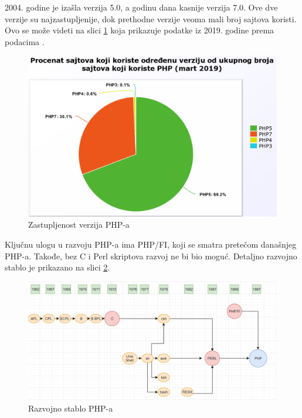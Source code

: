 \documentclass[a4paper]{article}
\begin{document}
{2004. godine je izašla verzija 5.0, a godinu dana kasnije verzija 7.0. Ove dve verzije su najzastupljenije, dok prethodne verzije veoma mali broj sajtova koristi. Ovo se može videti na slici \ref{fig:proc_zastupljenosti} koja prikazuje podatke iz 2019. godine prema podacima \cite{stats}.

\begin{figure}[h!]
\begin{center}
\includegraphics[scale=0.25]{zastupljenost2019.png}
\end{center}
\label{fig:proc_zastupljenosti}
\caption{Zastupljenost verzija PHP-a}
\end{figure}

Ključnu ulogu u razvoju PHP-a ima PHP/FI, koji se smatra pretečom današnjeg PHP-a. Takođe, bez C i Perl skriptova razvoj ne bi bio moguć. Detaljno razvojno stablo je prikazano na slici \ref{fig:r_stablo}.


\begin{figure}[h!]
\begin{center}
\includegraphics[scale=0.45]{razvojno_stablo.png}
\end{center}
\label{fig:r_stablo}
\caption{Razvojno stablo PHP-a}
\end{figure}

}
\end{document}
